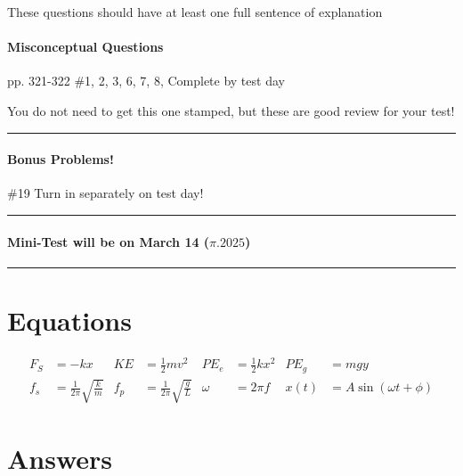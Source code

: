 \documentclass[10pt]{exam}
\begin{document}
{\sc These questions should have at least one full sentence 
      of explanation}



\paragraph{Misconceptual Questions} pp. 321-322 \#1, 2, 3, 6, 7, 8, 
\dotfill Complete by test day
   
{\sc You do not need to get this one stamped,
but these are good review for your test!}

\vspace{0.5em}
\hrule


\paragraph{Bonus Problems!} \#19
\dotfill Turn in separately on test day!

\vspace{0.5em}
\hrule


\paragraph{Mini-Test will be on March 14 ($\pi.2025$)} \hfill

\vspace{0.5em}

\hrule


\section*{Equations}

\begin{align*}
  F_S &= -kx &
  KE &= \frac{1}{2}mv^2 &
  PE_e &= \frac{1}{2}kx^2&
  PE_g &= mgy \\
  f_s &=\frac{1}{2\pi}\sqrt{\frac{k}{m}} &
  f_p &=\frac{1}{2\pi}\sqrt{\frac{g}{L}} &
  \omega &= 2\pi f &
  x(t) &= A \sin\left(\omega t + \phi\right)
\end{align*}



\pagebreak

\section*{Answers}
\end{document}
